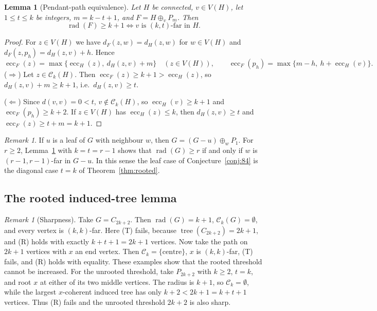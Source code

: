 \documentclass[11pt,a4paper]{article}
\newtheorem{lemma}[theorem]{Lemma}
\theoremstyle{remark}
\newtheorem{remark}[theorem]{Remark}
\newcommand{\rad}{\operatorname{rad}}
\newcommand{\ecc}{\operatorname{ecc}}
\newcommand{\tr}{\tree}
\newcommand{\C}{\mathcal C}
\newcommand{\plus}{\oplus}
\newcommand{\tree}{\operatorname{tree}}
\begin{document}
\begin{lemma}[Pendant-path equivalence]\label{lem:pendant}
Let $H$ be connected, $v\in V(H)$, let $1\le t\le k$ be integers, $m=k-t+1$, and $F=H\plus_v P_m$. Then
\[
\rad(F)\ge k+1 \iff v \text{ is } (k,t)\text{-far in } H .
\]
\end{lemma}

\begin{proof}
For $z\in V(H)$ we have $d_F(z,w)=d_H(z,w)$ for $w\in V(H)$ and $d_F(z,p_h)=d_H(z,v)+h$. Hence
\[
\ecc_F(z)=\max\{\ecc_H(z),\ d_H(z,v)+m\}\quad (z\in V(H)),\qquad \ecc_F(p_h)=\max\{m-h,\ h+\ecc_H(v)\}.
\]
($\Rightarrow$) Let $z\in\C_k(H)$. Then $\ecc_F(z)\ge k+1>\ecc_H(z)$, so $d_H(z,v)+m\ge k+1$, i.e.\ $d_H(z,v)\ge t$.

($\Leftarrow$) Since $d(v,v)=0<t$, $v\notin\C_k(H)$, so $\ecc_H(v)\ge k+1$ and $\ecc_F(p_h)\ge k+2$. If $z\in V(H)$ has $\ecc_H(z)\le k$, then $d_H(z,v)\ge t$ and $\ecc_F(z)\ge t+m=k+1$.
\end{proof}

\begin{remark}\label{rem:leaf}
If $u$ is a leaf of $G$ with neighbour $w$, then $G=(G-u)\plus_w P_1$. For $r\ge2$, Lemma~\ref{lem:pendant} with $k=t=r-1$ shows that $\rad(G)\ge r$ if and only if $w$ is $(r-1,r-1)$-far in $G-u$. In this sense the leaf case of Conjecture~\ref{conj:84} is the diagonal case $t=k$ of Theorem~\ref{thm:rooted}.
\end{remark}

\subsection{The rooted induced-tree lemma}\label{sec:rooted}

\begin{remark}[Sharpness]\label{rem:sharp}
Take $G=C_{2k+2}$. Then $\rad(G)=k+1$, $\C_k(G)=\emptyset$, and every vertex is $(k,k)$-far. Here (T) fails, because $\tr(C_{2k+2})=2k+1$, and (R) holds with exactly $k+t+1=2k+1$ vertices. Now take the path on $2k+1$ vertices with $x$ an end vertex. Then $\C_k=\{\text{centre}\}$, $x$ is $(k,k)$-far, (T) fails, and (R) holds with equality. These examples show that the rooted threshold cannot be increased.
For the unrooted threshold, take $P_{2k+2}$ with $k\ge2$, $t=k$, and root
$x$ at either of its two middle vertices. The radius is $k+1$, so
$\C_k=\emptyset$, while the largest $x$-coherent induced tree has only
$k+2<2k+1=k+t+1$ vertices. Thus (R) fails and the unrooted threshold
$2k+2$ is also sharp.
\end{remark}
\end{document}
